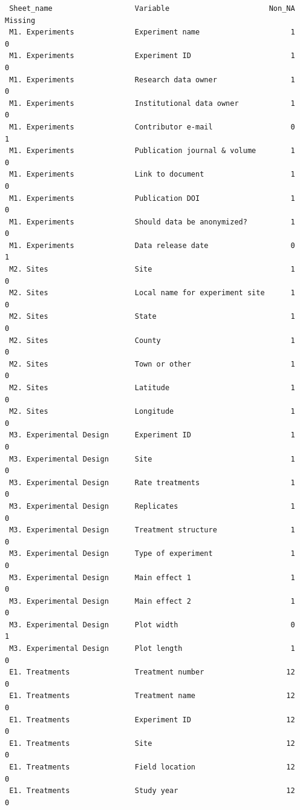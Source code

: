 \documentclass[
]{article}
\begin{document}
\begin{verbatim}
 Sheet_name                   Variable                       Non_NA Missing
 M1. Experiments              Experiment name                     1       0
 M1. Experiments              Experiment ID                       1       0
 M1. Experiments              Research data owner                 1       0
 M1. Experiments              Institutional data owner            1       0
 M1. Experiments              Contributor e-mail                  0       1
 M1. Experiments              Publication journal & volume        1       0
 M1. Experiments              Link to document                    1       0
 M1. Experiments              Publication DOI                     1       0
 M1. Experiments              Should data be anonymized?          1       0
 M1. Experiments              Data release date                   0       1
 M2. Sites                    Site                                1       0
 M2. Sites                    Local name for experiment site      1       0
 M2. Sites                    State                               1       0
 M2. Sites                    County                              1       0
 M2. Sites                    Town or other                       1       0
 M2. Sites                    Latitude                            1       0
 M2. Sites                    Longitude                           1       0
 M3. Experimental Design      Experiment ID                       1       0
 M3. Experimental Design      Site                                1       0
 M3. Experimental Design      Rate treatments                     1       0
 M3. Experimental Design      Replicates                          1       0
 M3. Experimental Design      Treatment structure                 1       0
 M3. Experimental Design      Type of experiment                  1       0
 M3. Experimental Design      Main effect 1                       1       0
 M3. Experimental Design      Main effect 2                       1       0
 M3. Experimental Design      Plot width                          0       1
 M3. Experimental Design      Plot length                         1       0
 E1. Treatments               Treatment number                   12       0
 E1. Treatments               Treatment name                     12       0
 E1. Treatments               Experiment ID                      12       0
 E1. Treatments               Site                               12       0
 E1. Treatments               Field location                     12       0
 E1. Treatments               Study year                         12       0

\end{verbatim}
\end{document}
